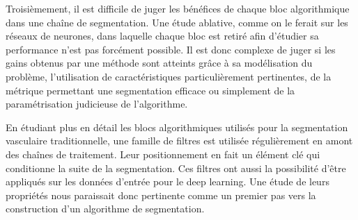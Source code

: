     Troisièmement, il est difficile de juger les bénéfices de chaque bloc algorithmique dans une chaîne de segmentation. Une étude ablative, comme on le ferait sur les réseaux de neurones, dans laquelle chaque bloc est retiré afin d'étudier sa performance n'est pas forcément possible. Il est donc complexe de juger si les gains obtenus par une méthode sont atteints grâce à sa modélisation du problème, l'utilisation de caractéristiques particulièrement pertinentes, de la métrique permettant une segmentation efficace ou simplement de la paramétrisation judicieuse de l'algorithme.

    En étudiant plus en détail les blocs algorithmiques utilisés pour la segmentation vasculaire traditionnelle, une famille de filtres est utilisée régulièrement en amont des chaînes de traitement. Leur positionnement en fait un élément clé qui conditionne la suite de la segmentation. Ces filtres ont aussi la possibilité d'être appliqués sur les données d'entrée pour le deep learning. Une étude de leurs propriétés nous paraissait donc pertinente comme un premier pas vers la construction d'un algorithme de segmentation.
